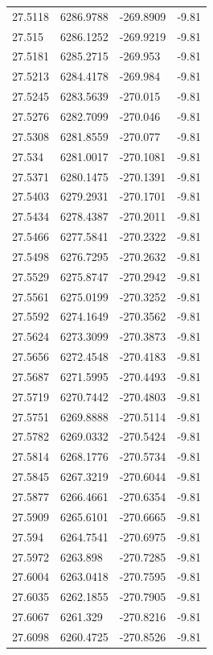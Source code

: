 \begin{table}[H]
\begin{tabular}{llll}
27.5118 & 6286.9788 & -269.8909 & -9.81 \\
27.515 & 6286.1252 & -269.9219 & -9.81 \\
27.5181 & 6285.2715 & -269.953 & -9.81 \\
27.5213 & 6284.4178 & -269.984 & -9.81 \\
27.5245 & 6283.5639 & -270.015 & -9.81 \\
27.5276 & 6282.7099 & -270.046 & -9.81 \\
27.5308 & 6281.8559 & -270.077 & -9.81 \\
27.534 & 6281.0017 & -270.1081 & -9.81 \\
27.5371 & 6280.1475 & -270.1391 & -9.81 \\
27.5403 & 6279.2931 & -270.1701 & -9.81 \\
27.5434 & 6278.4387 & -270.2011 & -9.81 \\
27.5466 & 6277.5841 & -270.2322 & -9.81 \\
27.5498 & 6276.7295 & -270.2632 & -9.81 \\
27.5529 & 6275.8747 & -270.2942 & -9.81 \\
27.5561 & 6275.0199 & -270.3252 & -9.81 \\
27.5592 & 6274.1649 & -270.3562 & -9.81 \\
27.5624 & 6273.3099 & -270.3873 & -9.81 \\
27.5656 & 6272.4548 & -270.4183 & -9.81 \\
27.5687 & 6271.5995 & -270.4493 & -9.81 \\
27.5719 & 6270.7442 & -270.4803 & -9.81 \\
27.5751 & 6269.8888 & -270.5114 & -9.81 \\
27.5782 & 6269.0332 & -270.5424 & -9.81 \\
27.5814 & 6268.1776 & -270.5734 & -9.81 \\
27.5845 & 6267.3219 & -270.6044 & -9.81 \\
27.5877 & 6266.4661 & -270.6354 & -9.81 \\
27.5909 & 6265.6101 & -270.6665 & -9.81 \\
27.594 & 6264.7541 & -270.6975 & -9.81 \\
27.5972 & 6263.898 & -270.7285 & -9.81 \\
27.6004 & 6263.0418 & -270.7595 & -9.81 \\
27.6035 & 6262.1855 & -270.7905 & -9.81 \\
27.6067 & 6261.329 & -270.8216 & -9.81 \\
27.6098 & 6260.4725 & -270.8526 & -9.81 \\

\end{tabular}
\end{table}
